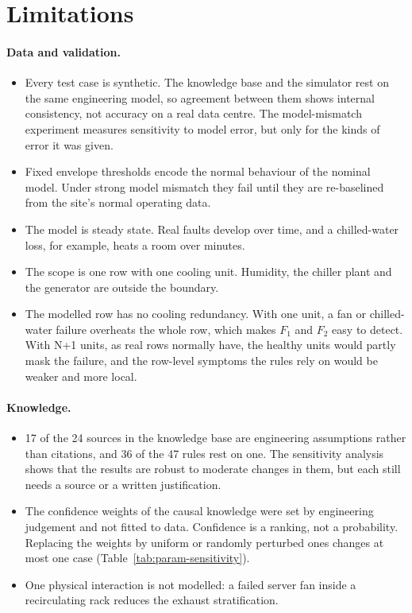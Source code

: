 \section{Limitations}
\label{sec:limitations}

\paragraph{Data and validation.}
\begin{itemize}
  \item Every test case is synthetic. The knowledge base and the simulator rest on the same engineering model, so agreement between them shows internal consistency, not accuracy on a real data centre. The model-mismatch experiment measures sensitivity to model error, but only for the kinds of error it was given.
  \item Fixed envelope thresholds encode the normal behaviour of the nominal model. Under strong model mismatch they fail until they are re-baselined from the site's normal operating data.
  \item The model is steady state. Real faults develop over time, and a chilled-water loss, for example, heats a room over minutes.
  \item The scope is one row with one cooling unit. Humidity, the chiller plant and the generator are outside the boundary.
  \item The modelled row has no cooling redundancy. With one unit, a fan or chilled-water failure overheats the whole row, which makes $F_1$ and $F_2$ easy to detect. With N+1 units, as real rows normally have, the healthy units would partly mask the failure, and the row-level symptoms the rules rely on would be weaker and more local.
\end{itemize}

\paragraph{Knowledge.}
\begin{itemize}
  \item 17 of the 24 sources in the knowledge base are engineering assumptions rather than citations, and 36 of the 47 rules rest on one. The sensitivity analysis shows that the results are robust to moderate changes in them, but each still needs a source or a written justification.
  \item The confidence weights of the causal knowledge were set by engineering judgement and not fitted to data. Confidence is a ranking, not a probability. Replacing the weights by uniform or randomly perturbed ones changes at most one case (Table~\ref{tab:param-sensitivity}).
  \item One physical interaction is not modelled: a failed server fan inside a recirculating rack reduces the exhaust stratification.
\end{itemize}

